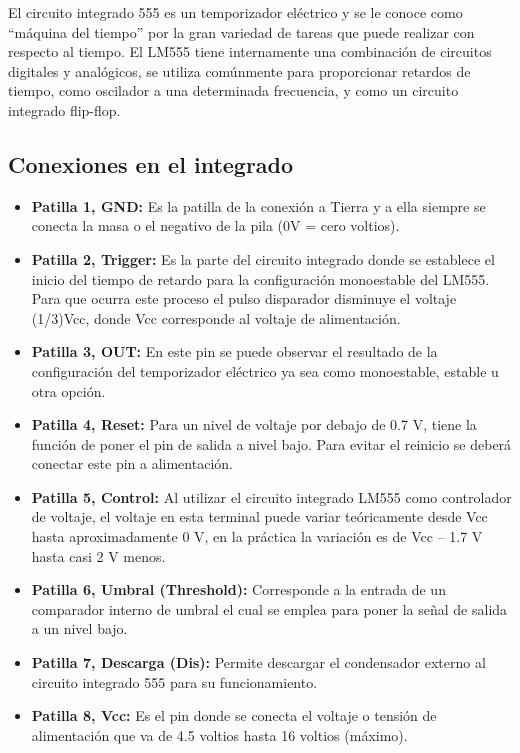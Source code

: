 \documentclass[osajnl,twocolumn,showpacs,superscriptaddress,10pt]{revtex4-1}
\begin{document}
El circuito integrado 555 es un temporizador eléctrico y se le conoce como “máquina del tiempo” por la gran variedad de tareas que puede realizar con respecto al tiempo. El LM555 tiene internamente una combinación de circuitos digitales y analógicos, se utiliza comúnmente para proporcionar retardos de tiempo, como oscilador a una determinada frecuencia, y como un circuito integrado flip-flop.

\subsection{Conexiones en el integrado}

\begin{itemize}
	\item \textbf{Patilla 1, GND:} Es la patilla de la conexión a Tierra y a ella siempre se conecta la masa o el negativo de la pila (0V = cero voltios).
	
	\item \textbf{Patilla 2, Trigger:} Es la parte del circuito integrado donde se establece el inicio del tiempo de retardo para la configuración monoestable del LM555. Para que ocurra este proceso el pulso disparador disminuye el voltaje (1/3)Vcc, donde Vcc corresponde al voltaje de alimentación.
	
	\item \textbf{Patilla 3, OUT:} En este pin se puede observar el resultado de la configuración del temporizador eléctrico ya sea como monoestable, estable u otra opción.
	
	\item \textbf{Patilla 4, Reset:} Para un nivel de voltaje por debajo de 0.7 V, tiene la función de poner el pin de salida a nivel bajo. Para evitar el reinicio se deberá conectar este pin a alimentación.
	
	\item \textbf{Patilla 5, Control:} Al utilizar el circuito integrado LM555 como controlador de voltaje, el voltaje en esta terminal puede variar teóricamente desde Vcc hasta aproximadamente 0 V, en la práctica la variación es de Vcc – 1.7 V hasta casi 2 V menos.
	
	\item \textbf{Patilla 6, Umbral (Threshold):} Corresponde a la entrada de un comparador interno de umbral el cual se emplea para poner la señal de salida a un nivel bajo.
	
	\item \textbf{Patilla 7, Descarga (Dis):} Permite descargar el condensador externo al circuito integrado 555 para su funcionamiento.
	
	\item \textbf{Patilla 8, Vcc:} Es el pin donde se conecta el voltaje o tensión de alimentación que va de 4.5 voltios hasta 16 voltios (máximo).
\end{itemize}
\end{document}

